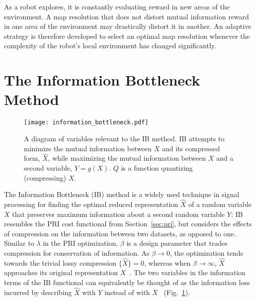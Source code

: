 As a robot explores, it is constantly evaluating reward in new areas of the
environment. A map resolution that does not distort mutual information reward in one area
of the environment may drastically distort it in another. An adaptive strategy
is therefore developed to select an optimal map resolution whenever the complexity of the
robot's local environment has changed significantly.


\section{The Information Bottleneck Method}

\begin{figure}[h]
  \centering
  \texttt{[image: information\_bottleneck.pdf]}
  \caption[Diagram of the Information Bottleneck.]{A diagram of variables
  relevant to the IB method. IB attempts to minimize the mutual information
between $X$ and its compressed form, $\hat{X}$, while maximizing the mutual information
between $X$ and a second variable, $Y = g(X)$. $Q$ is a function quantizing
(compressing) $X$.\label{fig:ib_diagram}}
\end{figure}

The Information Bottleneck (IB) method is a widely used technique in signal processing for
finding the optimal reduced representation $\hat{X}$ of a random variable $X$ that preserves
maximum information about a second random variable $Y$:
%
%
IB resembles the PRI cost functional from Section~\ref{sec:pri}, but considers the effects of
compression on the information between two datasets, as opposed to one. Similar to $\lambda$
in the PRI optimization, $\beta$ is a design parameter that trades compression for conservation
of information. As $\beta \rightarrow 0$, the optimization tends towards the trivial lossy
compression $\{\hat{X}\}=0$, whereas when $\beta \rightarrow \infty$, $\hat{X}$ approaches
its original representation $X$~\cite{principe2010information}. The two
variables in the information terms of the IB functional can equivalently be thought of as the
information loss incurred by describing $\hat{X}$ with $Y$ instead of with
$X$~\cite{geiger2011information,geiger2013signal} (Fig.~\ref{fig:ib_diagram}).

